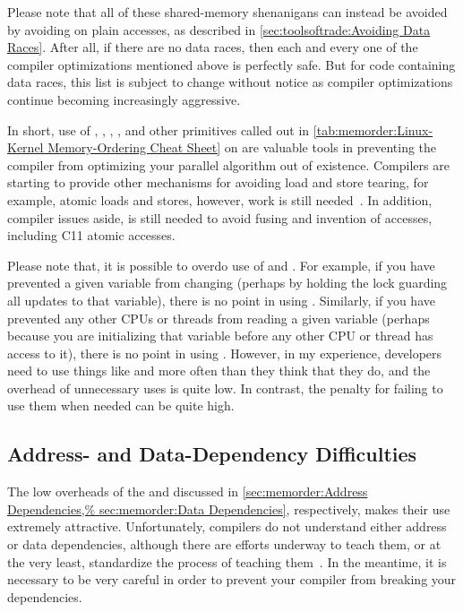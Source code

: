 Please note that all of these shared-memory shenanigans can instead be
avoided by avoiding  on plain accesses, as described in
\cref{sec:toolsoftrade:Avoiding Data Races}.
After all, if there are no data races, then each and every one of the
compiler optimizations mentioned above is perfectly safe.
But for code containing data races, this list is subject to change
without notice as compiler optimizations continue becoming increasingly
aggressive.

In short, use of , , ,
, and other primitives called out in
\cref{tab:memorder:Linux-Kernel Memory-Ordering Cheat Sheet}
on
are valuable tools in preventing the compiler from
optimizing your parallel algorithm out of existence.
Compilers are starting to provide other mechanisms for avoiding
load and store tearing, for example, 
atomic loads and stores, however, work is still
needed~\cite{JonathanCorbet2016C11atomics}.
In addition, compiler issues aside,  is still needed
to avoid fusing and invention of accesses, including C11 atomic accesses.

Please note that, it is possible to overdo use of  and
.
For example, if you have prevented a given variable from changing
(perhaps by holding the lock guarding all updates to that
variable), there is no point in using .
Similarly, if you have prevented any other CPUs or threads from
reading a given variable (perhaps because you are initializing
that variable before any other CPU or thread has access to it),
there is no point in using .
However, in my experience, developers need to use things like
 and  more often than they think that
they do, and the overhead of unnecessary uses is quite low.
In contrast, the penalty for failing to use them when needed can be quite high.

\subsection{Address- and Data-Dependency Difficulties}
\label{sec:memorder:Address- and Data-Dependency Difficulties}

The low overheads of the 
and  discussed in
\cref{sec:memorder:Address Dependencies,%
sec:memorder:Data Dependencies},
respectively, makes their use extremely attractive.
Unfortunately, compilers do not understand either address or data
dependencies, although there are efforts underway to teach them, or at
the very least, standardize the process of teaching
them~\cite{PaulEMcKennneyConsumeP0190R4,PaulEMcKenney2017markconsumeP0462R1}.
In the meantime, it is necessary to be very careful in order to prevent
your compiler from breaking your dependencies.

